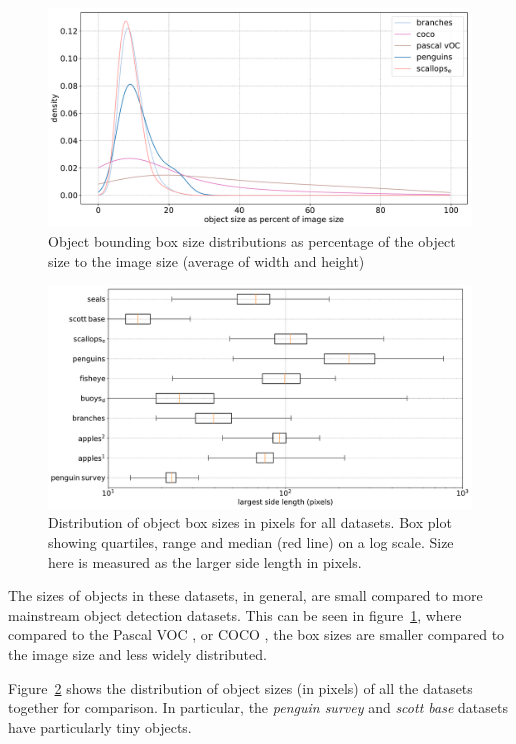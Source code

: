\begin{figure}[ht]
\centering
\includegraphics[width=1.0\linewidth]{charts/summaries/sizes_density.pdf}
\caption{Object bounding box size distributions as percentage of the object size to the image size (average of width and height) }
\label{fig:box_sizes}
\end{figure}
 

\begin{figure}[ht]
\centering
\includegraphics[width=1.0\linewidth]{charts/summaries/sizes_boxplot.pdf}
\caption{ Distribution of object box sizes in pixels for all datasets. Box plot showing quartiles, range and median (red line) on a log scale. Size here is measured as the larger side length in pixels. }
\label{fig:box_sizes_plot}
\end{figure}

The sizes of objects in these datasets, in general, are small compared to more mainstream object detection datasets. This can be seen in figure~\ref{fig:box_sizes}, where compared to the Pascal VOC \cite{Everingham2008}, or COCO \cite{Lin2014}, the box sizes are smaller compared to the image size and less widely distributed. 

Figure~\ref{fig:box_sizes_plot}  shows the distribution of object sizes (in pixels) of all the datasets together for comparison. In particular, the \emph{penguin survey} and \emph{scott base} datasets have particularly tiny objects.

